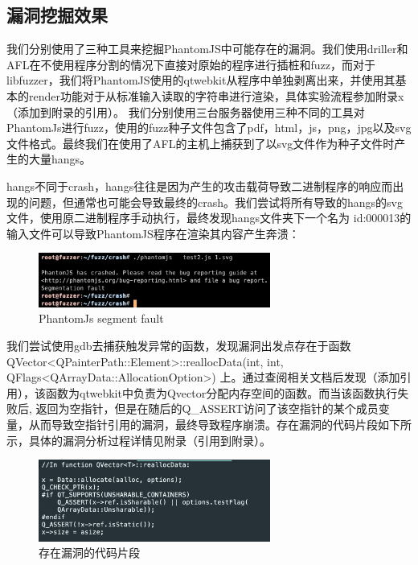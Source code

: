 \documentclass[doctor,privacy,twoside]{buaa_mac}
\begin{document}
\subsection{漏洞挖掘效果}
我们分别使用了三种工具来挖掘PhantomJS中可能存在的漏洞。我们使用driller和AFL在不使用程序分割的情况下直接对原始的程序进行插桩和fuzz，而对于libfuzzer，我们将PhantomJS使用的qtwebkit从程序中单独剥离出来，并使用其基本的render功能对于从标准输入读取的字符串进行渲染，具体实验流程参加附录x（添加到附录的引用）。 我们分别使用三台服务器使用三种不同的工具对PhantomJs进行fuzz，使用的fuzz种子文件包含了pdf，html，js，png，jpg以及svg文件格式。最终我们在使用了AFL的主机上捕获到了以svg文件作为种子文件时产生的大量hangs。

hangs不同于crash，hangs往往是因为产生的攻击载荷导致二进制程序的响应而出现的问题，但通常也可能会导致最终的crash。我们尝试将所有导致的hangs的svg文件，使用原二进制程序手动执行，最终发现hangs文件夹下一个名为 id:000013的输入文件可以导致PhantomJS程序在渲染其内容产生奔溃：

\centerline{}
\begin{figure}[!h]
  \centering
  \includegraphics[width=0.68\textwidth]{images/seg_fault.png}
  \caption{PhantomJs segment fault}
  \label{fig:logo}
\end{figure}
\centerline{}

我们尝试使用gdb去捕获触发异常的函数，发现漏洞出发点存在于函数 QVector<QPainterPath::Element>::reallocData(int, int, QFlags<QArrayData::AllocationOption>) 上。通过查阅相关文档后发现（添加引用），该函数为qtwebkit中负责为Qvector分配内存空间的函数。而当该函数执行失败后, 返回为空指针，但是在随后的Q\_{}ASSERT访问了该空指针的某个成员变量，从而导致空指针引用的漏洞，最终导致程序崩溃。存在漏洞的代码片段如下所示，具体的漏洞分析过程详情见附录（引用到附录）。


\centerline{}
\begin{figure}[!h]
  \centering
  \includegraphics[width=0.68\textwidth]{images/vuln_func.png}
  \caption{存在漏洞的代码片段}
  \label{fig:logo}
\end{figure}
\centerline{}
\end{document}
